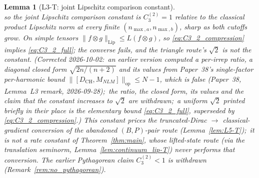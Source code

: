 \documentclass[11pt,a4paper]{article}
\theoremstyle{plain}
\newtheorem{lemma}[theorem]{Lemma}
\theoremstyle{definition}
\newcommand{\nmaxa}{n_{\max,a}}
\newcommand{\nmaxb}{n_{\max,b}}
\newcommand{\opnorm}[1]{\lVert #1 \rVert_{\mathrm{op}}}
\newcommand{\norm}[1]{\lVert #1 \rVert}
\newcommand{\Mat}{M}
\newcommand{\DCH}{D_{\mathrm{CH}}}
\begin{document}
\begin{lemma}[L3-T: joint Lipschitz comparison constant]
\begin{equation}
\end{equation}
so the joint Lipschitz comparison constant is $C_3^{(2)} = 1$ relative to the
classical product Lipschitz norm at every finite $(\nmaxa, \nmaxb)$, sharp as
both cutoffs grow. On simple tensors $\norm{f\otimes g}_{\mathrm{Lip}} \le
L(f\otimes g)$, so \eqref{eq:C3_2_compression} implies \eqref{eq:C3_2_full};
the converse fails, and the triangle route's $\sqrt 2$ is not the constant.
(Corrected 2026-10-02:\ an earlier
version computed a per-irrep ratio, a diagonal closed form
$\sqrt{2n/(n+2)}$ and its values from Paper~38's single-factor
per-harmonic bound $\opnorm{[\DCH, \Mat_{NLM}]} \le N - 1$, which is false
(Paper~38, Lemma~L3 remark, 2026-09-28);\ the ratio, the closed form, its
values and the claim that the constant increases to $\sqrt 2$ are
withdrawn;\ a uniform $\sqrt 2$ printed briefly in their place is the
elementary bound \eqref{eq:C3_2_full}, superseded by
\eqref{eq:C3_2_compression}.) This constant prices the truncated-Dirac
$\to$ classical-gradient conversion of the abandoned $(B,P)$-pair route
(Lemma~\ref{lem:L5-T});\ it is \emph{not} a rate constant of
Theorem~\ref{thm:main}, whose lifted-state route (via the translation
seminorm, Lemma~\ref{lem:continuum_lip-T}) never performs that conversion.
The earlier Pythagorean claim $C_3^{(2)} < 1$ is withdrawn
(Remark~\ref{rem:no_pythagorean}).
\end{lemma}
\end{document}
